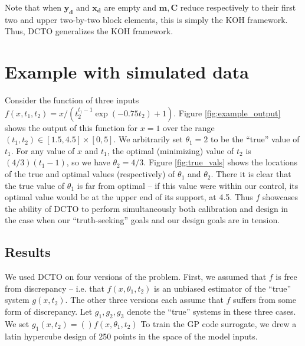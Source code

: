 \documentclass[12pt]{article}
\begin{document}
%
Note that when $\mathbf{y_d}$ and $\mathbf{x_d}$ are empty and $\mathbf m, \mathbf C$ reduce respectively to their first two and upper two-by-two block elements, this is simply the KOH framework.
%
Thus, DCTO generalizes the KOH framework.
%

%
\section{Example with simulated data}
%
Consider the function of three inputs $f(x,t_1,t_2) = x / (t_2^{t_1-1}\exp(-0.75t_2)+1)$. 
%
Figure \ref{fig:example_output} shows the output of this function for $x=1$ over the range $(t_1,t_2)\in[1.5,4.5]\times[0,5]$.
%
%
We arbitrarily set $\theta_1=2$ to be the ``true'' value of $t_1$.
%
For any value of $x$ and $t_1$, the optimal (minimizing) value of $t_2$ is $(4/3)(t_1-1)$, so we have $\theta_2=4/3.$
%
Figure \ref{fig:true_vals} shows the locations of the true and optimal values (respectively) of $\theta_1$ and $\theta_2$.
%
%
There it is clear that the true value of $\theta_1$ is far from optimal -- if this value were within our control, its optimal value would be at the upper end of its support, at 4.5.
%
Thus $f$ showcases the ability of DCTO to perform simultaneously both calibration and design in the case when our ``truth-seeking'' goals and our design goals are in tension.
%

%
\subsection{Results}
% 
We used DCTO on four versions of the problem.
%
First, we assumed that $f$ is free from discrepancy -- i.e. that $f(x,\theta_1,t_2)$ is an unbiased estimator of the ``true'' system $g(x,t_2)$.
%
The other three versions each assume that $f$ suffers from some form of discrepancy.
%
Let $g_1,g_2,g_3$ denote the ``true'' systems in these three cases.
%
We set $g_1(x,t_2) = \left( \right) f(x,\theta_1,t_2)$ %
%
To train the GP code surrogate, we drew a latin hypercube design of 250 points in the space of the model inputs.
%


\bigskip

%
%
%
%




\end{document}
